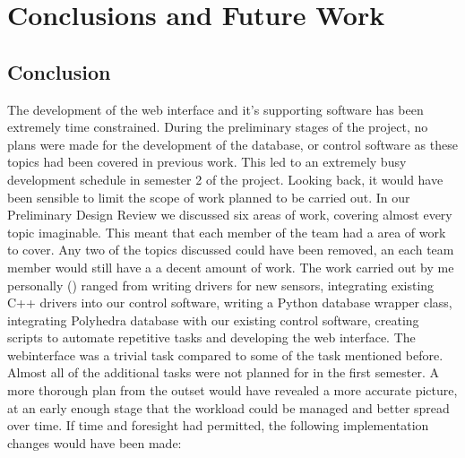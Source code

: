 \section{Conclusions and Future Work}

\subsection{Conclusion}
The development of the web interface and it's supporting software has been extremely time constrained. During the preliminary stages of the project, no plans were made for the development of the database, or control software as these topics had been covered in previous work. This led to an extremely busy development schedule in semester 2 of the project.
\newline
Looking back, it would have been sensible to limit the scope of work planned to be carried out. In our Preliminary Design Review \cite{tibby-lit-review} we discussed six areas of work, covering almost every topic imaginable. This meant that each member of the team had a area of work to cover. Any two of the topics discussed could have been removed, an each team member would still have a a decent amount of work.
\newline
The work carried out by me personally (\cameron) ranged from writing drivers for new sensors, integrating existing C++ drivers into our control software, writing a Python database wrapper class, integrating Polyhedra database with our existing control software, creating scripts to automate repetitive tasks and developing the web interface. The \gls{webinterface} was a trivial task compared to some of the task mentioned before. Almost all of the additional tasks were not planned for in the first semester. A more thorough plan from the outset would have revealed a more accurate picture, at an early enough stage that the workload could be managed and better spread over time.
\newline
If time and foresight had permitted, the following implementation changes would have been made:
